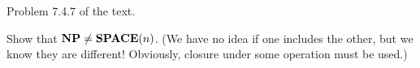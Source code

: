 \documentclass{../math167}
\begin{document}
\begin{problems}
  \begin{solution}
  \end{solution}

\item Problem 7.4.7 of the text.
  \begin{book}
    Show that \(\mathbf{NP} \ne \mathbf{SPACE}(n)\).  (We have no idea if one includes
    the other, but we know they are different!  Obviously, closure
    under some operation must be used.)
  \end{book}

  \begin{solution}
  \end{solution}

\end{problems}
\end{document}
